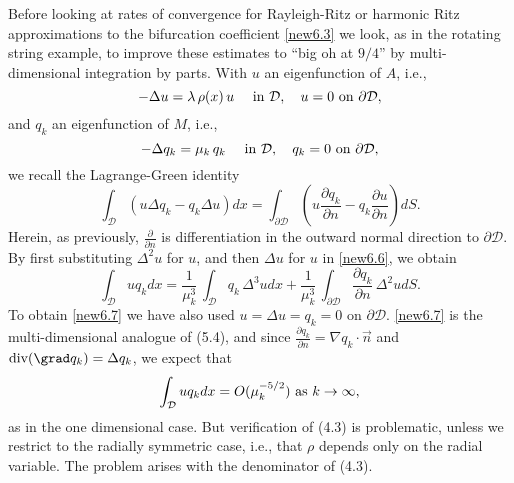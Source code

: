 \documentclass[final]{siamltex}
\numberwithin{equation}{section}
\begin{document}
Before looking at rates of convergence for Rayleigh-Ritz or harmonic Ritz approximations to the bifurcation coefficient \eqref{new6.3} we look, as in the rotating string example, to improve these estimates to ``big oh at $9/4$'' by multi-dimensional integration by parts. With $u$ an eigenfunction of $A$, i.e.,
\begin{equation} \notag
-\Delta u = \lambda \, \rho(x) \, u \quad \text{ in } \mathcal{D}, \quad u = 0 \text{ on } \partial \mathcal{D},
\end{equation}
and $q_k$ an eigenfunction of $M$, i.e.,
\begin{equation} \notag
-\Delta q_k = \mu_k \, q_k \quad \text{ in } \mathcal{D}, \quad q_k = 0 \text{ on } \partial \mathcal{D},
\end{equation}
we recall the Lagrange-Green identity
\begin{equation} \label{new6.6}
\int_{\mathcal{D}} \left(u \Delta q_k - q_k \Delta u\right) dx = \int_{\partial \mathcal{D}} \left( u \frac{\partial q_k}{\partial n}-
 q_k \frac{\partial u }{\partial n} \right) dS.
 \end{equation}
Herein, as previously, $\frac{\partial}{\partial n}$ is differentiation in the outward normal direction to $\partial \mathcal{D}$. By first substituting $\Delta^2 u$ for $u$, and then $\Delta u$ for $u$ in \eqref{new6.6}, we obtain
\begin{equation} \label{new6.7}
\int_{\mathcal{D}} u q_k dx = \frac{1}{\mu_k^3} \, \int_{\mathcal{D}} q_k \, \Delta^3 u  dx + \frac{1}{\mu_k^3} \, \int_{\partial \mathcal{D}} \frac{\partial q_k}{\partial n} \, \Delta^2 u dS.
\end{equation}
To obtain \eqref{new6.7} we have also used $u=\Delta u=q_k=0$ on $\partial \mathcal{D}$. \eqref{new6.7} is the multi-dimensional analogue of (5.4), and since
$\frac{\partial q_k}{\partial n}=\nabla q_k \cdot \overrightarrow{n}$ and $\text{div}(\grad q_k)=\Delta q_k$, we expect that
\begin{equation}\notag
\int_{\mathcal{D}} u q_k dx = O(\mu_k^{-5/2}) \text{ as } k \to \infty,
\end{equation}
as in the one dimensional case. But verification of (4.3) is problematic, unless we restrict to the radially symmetric case, i.e., that $\rho$ depends only on the radial variable. The problem arises with the denominator of (4.3).
\end{document}
